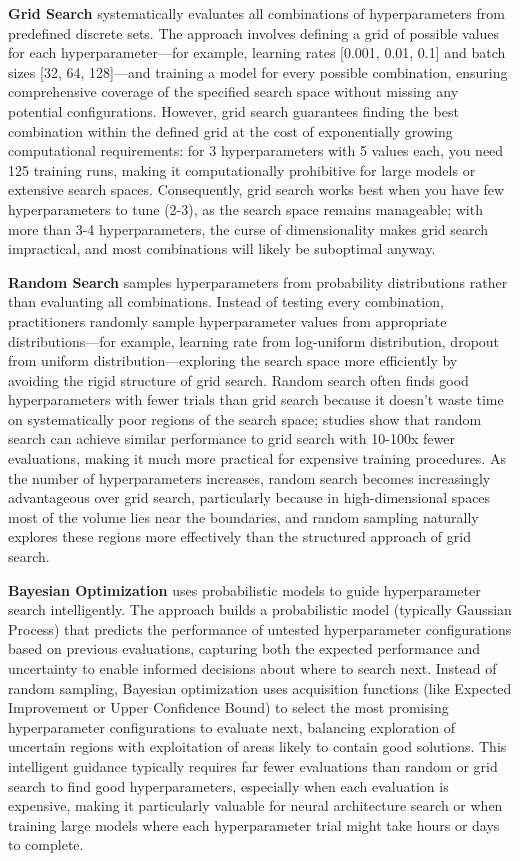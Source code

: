 \textbf{Grid Search} systematically evaluates all combinations of hyperparameters from predefined discrete sets. The approach involves defining a grid of possible values for each hyperparameter—for example, learning rates [0.001, 0.01, 0.1] and batch sizes [32, 64, 128]—and training a model for every possible combination, ensuring comprehensive coverage of the specified search space without missing any potential configurations. However, grid search guarantees finding the best combination within the defined grid at the cost of exponentially growing computational requirements: for 3 hyperparameters with 5 values each, you need 125 training runs, making it computationally prohibitive for large models or extensive search spaces. Consequently, grid search works best when you have few hyperparameters to tune (2-3), as the search space remains manageable; with more than 3-4 hyperparameters, the curse of dimensionality makes grid search impractical, and most combinations will likely be suboptimal anyway.

\textbf{Random Search} samples hyperparameters from probability distributions rather than evaluating all combinations. Instead of testing every combination, practitioners randomly sample hyperparameter values from appropriate distributions—for example, learning rate from log-uniform distribution, dropout from uniform distribution—exploring the search space more efficiently by avoiding the rigid structure of grid search. Random search often finds good hyperparameters with fewer trials than grid search because it doesn't waste time on systematically poor regions of the search space; studies show that random search can achieve similar performance to grid search with 10-100x fewer evaluations, making it much more practical for expensive training procedures. As the number of hyperparameters increases, random search becomes increasingly advantageous over grid search, particularly because in high-dimensional spaces most of the volume lies near the boundaries, and random sampling naturally explores these regions more effectively than the structured approach of grid search.

\textbf{Bayesian Optimization} uses probabilistic models to guide hyperparameter search intelligently. The approach builds a probabilistic model (typically Gaussian Process) that predicts the performance of untested hyperparameter configurations based on previous evaluations, capturing both the expected performance and uncertainty to enable informed decisions about where to search next. Instead of random sampling, Bayesian optimization uses acquisition functions (like Expected Improvement or Upper Confidence Bound) to select the most promising hyperparameter configurations to evaluate next, balancing exploration of uncertain regions with exploitation of areas likely to contain good solutions. This intelligent guidance typically requires far fewer evaluations than random or grid search to find good hyperparameters, especially when each evaluation is expensive, making it particularly valuable for neural architecture search or when training large models where each hyperparameter trial might take hours or days to complete.

